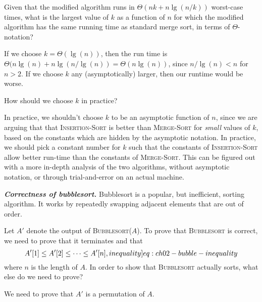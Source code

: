 \documentclass[Chapter02]{subfiles}
\begin{document}
\begin{problems}
\begin{problems}
			\item Given that the modified algorithm runs in $\Theta(nk + n\lg(n / k))$ worst-case times, what is the largest value of $k$ as a function of $n$ for which the modified algorithm has the same running time as standard merge sort, in terms of $\Theta$-notation?
			\begin{answer}
				If we choose $k = \Theta(\lg(n))$, then the run time is $\Theta(n\lg(n) + n \lg(n / \lg(n)) = \Theta(n\lg(n))$, since $n / \lg(n) < n$ for $n > 2$. If we choose $k$ any (asymptotically) larger, then our runtime would be worse.
			\end{answer}
			
			\item How should we choose $k$ in practice?
			\begin{answer}
				In practice, we shouldn't choose $k$ to be an asymptotic function of $n$, since we are arguing that that \textsc{Insertion-Sort} is better than \textsc{Merge-Sort} for \emph{small} values of $k$, based on the constants which are hidden by the asymptotic notation. In practice, we should pick a constant number for $k$ such that the constants of \textsc{Insertion-Sort} allow better run-time than the constants of \textsc{Merge-Sort}. This can be figured out with a more in-depth analysis of the two algorithms, without asymptotic notation, or through trial-and-error on an actual machine.
			\end{answer}
			
		\end{problems}

		\item \textbf{\textit{Correctness of bubblesort.}} Bubblesort is a popular, but inefficient, sorting algorithm. It works by repeatedly swapping adjacent elements that are out of order.

		\begin{algorithm}[H]

		\end{algorithm}
		\begin{problems}
			\item Let $A'$ denote the output of \textsc{Bubblesort($A$)}. To prove that \textsc{Bubblesort} is correct, we need to prove that it terminates and that
			\begin{equation}
				A'[1] \leq A'[2] \leq \dots \leq A'[n], \label[inequality]{eq:ch02-bubble-inequality}
			\end{equation}
			where $n$ is the length of $A$. In order to show that \textsc{Bubblesort} actually sorts, what else do we need to prove?
			\begin{answer}
				We need to prove that $A'$ is a permutation of $A$.
			\end{answer}
		\end{problems}


\end{problems}
\end{document}

